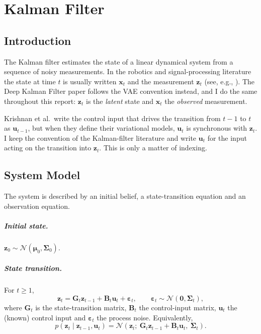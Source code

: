 \chapter{Kalman Filter}\label{chap:kalman}

\section{Introduction}

The Kalman filter estimates the state of a linear dynamical system from a
sequence of noisy measurements. In the robotics and signal-processing
literature the state at time $t$ is usually written $\mathbf{x}_t$ and
the measurement $\mathbf{z}_t$ (see, e.g., \cite{thrun2005probabilistic}).
The Deep Kalman Filter paper \cite{krishnan2015deep} follows the VAE
convention instead, and I do the same throughout this report:
$\mathbf{z}_t$ is the \emph{latent} state and $\mathbf{x}_t$ the
\emph{observed} measurement.

\begin{story}
Krishnan et al.\ write the control input that drives the transition from
$t-1$ to $t$ as $\mathbf{u}_{t-1}$, but when they define their
variational models, $\mathbf{u}_{t}$ is synchronous with
$\mathbf{z}_{t}$. I keep the convention of the Kalman-filter literature
and write $\mathbf{u}_{t}$ for the input acting on the transition into
$\mathbf{z}_{t}$. This is only a matter of indexing.
\end{story}

\section{System Model}

The system is described by an initial belief, a state-transition
equation and an observation equation.

\paragraph{Initial state.}
$\mathbf{z}_{0} \sim \mathcal{N}(\boldsymbol{\mu}_{0},
\boldsymbol{\Sigma}_{0})$.

\paragraph{State transition.} For $t \geq 1$,
\begin{equation*}
    \mathbf{z}_t = \mathbf{G}_t \mathbf{z}_{t-1} + \mathbf{B}_t
    \mathbf{u}_t + \boldsymbol{\varepsilon}_t,
    \qquad
    \boldsymbol{\varepsilon}_t \sim \mathcal{N}(\mathbf{0},
    \boldsymbol{\Sigma}_{t}),
\end{equation*}
where $\mathbf{G}_t$ is the state-transition matrix, $\mathbf{B}_t$ the
control-input matrix, $\mathbf{u}_t$ the (known) control input and
$\boldsymbol{\varepsilon}_t$ the process noise. Equivalently,
\begin{equation}
    p(\mathbf{z}_t \mid \mathbf{z}_{t-1}, \mathbf{u}_t) =
    \mathcal{N}(\mathbf{z}_t;\ \mathbf{G}_t \mathbf{z}_{t-1} +
    \mathbf{B}_t \mathbf{u}_t,\ \boldsymbol{\Sigma}_{t}).
    \label{eq:1}
\end{equation}

